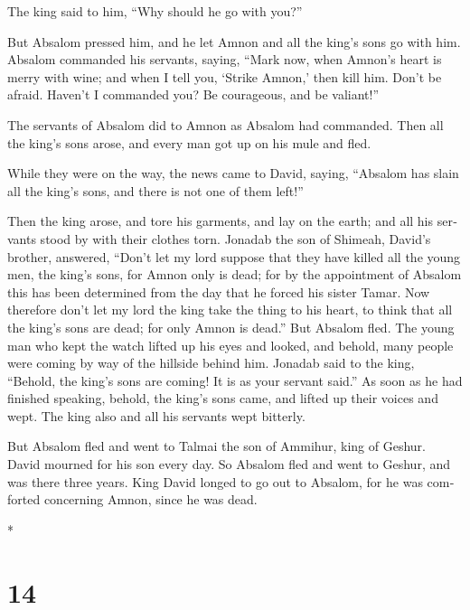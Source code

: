 \begin{paracol}{2}
\begin{otherlanguage}{english}
The king said to him, ``Why should he go with you?''

 But Absalom pressed him, and he let Amnon and all the
king's sons go with him.  Absalom commanded his servants,
saying, ``Mark now, when Amnon's heart is merry with wine; and when I
tell you, `Strike Amnon,' then kill him. Don't be afraid. Haven't I
commanded you? Be courageous, and be valiant!''

 The servants of Absalom did to Amnon as Absalom had
commanded. Then all the king's sons arose, and every man got up on his
mule and fled.

 While they were on the way, the news came to David,
saying, ``Absalom has slain all the king's sons, and there is not one of
them left!''

 Then the king arose, and tore his garments, and lay on
the earth; and all his servants stood by with their clothes torn.
 Jonadab the son of Shimeah, David's brother, answered,
``Don't let my lord suppose that they have killed all the young men, the
king's sons, for Amnon only is dead; for by the appointment of Absalom
this has been determined from the day that he forced his sister Tamar.
 Now therefore don't let my lord the king take the thing
to his heart, to think that all the king's sons are dead; for only Amnon
is dead.''  But Absalom fled. The young man who kept the
watch lifted up his eyes and looked, and behold, many people were coming
by way of the hillside behind him.  Jonadab said to the
king, ``Behold, the king's sons are coming! It is as your servant
said.''  As soon as he had finished speaking, behold, the
king's sons came, and lifted up their voices and wept. The king also and
all his servants wept bitterly.

 But Absalom fled and went to Talmai the son of Ammihur,
king of Geshur. David mourned for his son every day.  So
Absalom fled and went to Geshur, and was there three years.
 King David longed to go out to Absalom, for he was
comforted concerning Amnon, since he was dead.

\end{otherlanguage}

\switchcolumn[0]*

\hypertarget{section-26}{%
\section{14}\label{section-26}}


\end{paracol}
